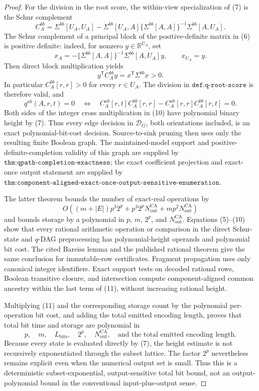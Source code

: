 \documentclass{article}
\begin{document}
\begin{proof}
For the division in the root score, the within-view specialization of (7) is the Schur complement
\[
 C_A^{bb}
 =\Sigma^{bb}[U_A,U_A]
 -\Sigma^{bb}[U_A,A]
  \{\Sigma^{bb}[A,A]\}^{-1}
  \Sigma^{bb}[A,U_A].
\tag{8}
\]
The Schur complement of a principal block of the positive-definite matrix in (6) is positive definite: indeed, for nonzero \(y\in\mathbb R^{U_A}\), set
\[
 x_A=-\{\Sigma^{bb}[A,A]\}^{-1}
       \Sigma^{bb}[A,U_A]y,
 \qquad x_{U_A}=y.
\]
Then direct block multiplication yields
\[
 y^{\mathsf T}C_A^{bb}y
 =x^{\mathsf T}\Sigma^{bb}x>0.
\tag{9}
\]
In particular \(C_A^{bb}[r,r]>0\) for every \(r\in U_A\).  The division in \(\texttt{def:q-root-score}\) is therefore valid, and
\[
 q^{ab}(A,r,t)=0
 \quad\Longleftrightarrow\quad
 C_A^{ab}[r,t]C_A^{bb}[r,r]
 -C_A^{ab}[r,r]C_A^{bb}[r,t]=0.
\tag{10}
\]
Both sides of the integer cross multiplication in (10) have polynomial binary height by (7).  Thus every edge decision in \(\mathcal D_G\), both orientations included, is an exact polynomial-bit-cost decision.  Source-to-sink pruning then uses only the resulting finite Boolean graph.  The maintained-model support and positive-definite-completion validity of this graph are supplied by \(\texttt{thm:qpath-completion-exactness}\); the exact coefficient projection and exact-once output statement are supplied by \(\texttt{thm:component-aligned-exact-once-output-sensitive-enumeration}\).

The latter theorem bounds the number of exact-real operations by
\[
 O\!\left((m+|E|)p^3 2^p
 +p^3 2^pN_{\mathrm{out}}^{\mathrm{CA}}
 +mp^2N_{\mathrm{out}}^{\mathrm{CA}}\right)
\tag{11}
\]
and bounds storage by a polynomial in \(p\), \(m\), \(2^p\), and \(N_{\mathrm{out}}^{\mathrm{CA}}\).  Equations (5)--(10) show that every rational arithmetic operation or comparison in the direct Schur-state and \(q\)-DAG preprocessing has polynomial-height operands and polynomial bit cost.  The cited Bareiss lemma and the published rational theorem give the same conclusion for immutable-row certificates.  Fragment propagation uses only canonical integer identifiers.  Exact support tests on decoded rational rows, Boolean transitive closure, and intersection compute component-aligned common ancestry within the last term of (11), without increasing rational height.

Multiplying (11) and the corresponding storage count by the polynomial per-operation bit cost, and adding the total emitted encoding length, proves that total bit time and storage are polynomial in
\[
 p,\quad m,\quad L_{\mathrm{bits}},\quad 2^p,
 \quad N_{\mathrm{out}}^{\mathrm{CA}},\quad
 \text{and the total emitted encoding length}.
\]
Because every state is evaluated directly by (7), the height estimate is not recursively exponentiated through the subset lattice.  The factor \(2^p\) nevertheless remains explicit even when the numerical output set is small.  Thus this is a deterministic subset-exponential, output-sensitive total bit bound, not an output-polynomial bound in the conventional input-plus-output sense.
\end{proof}
\end{document}
